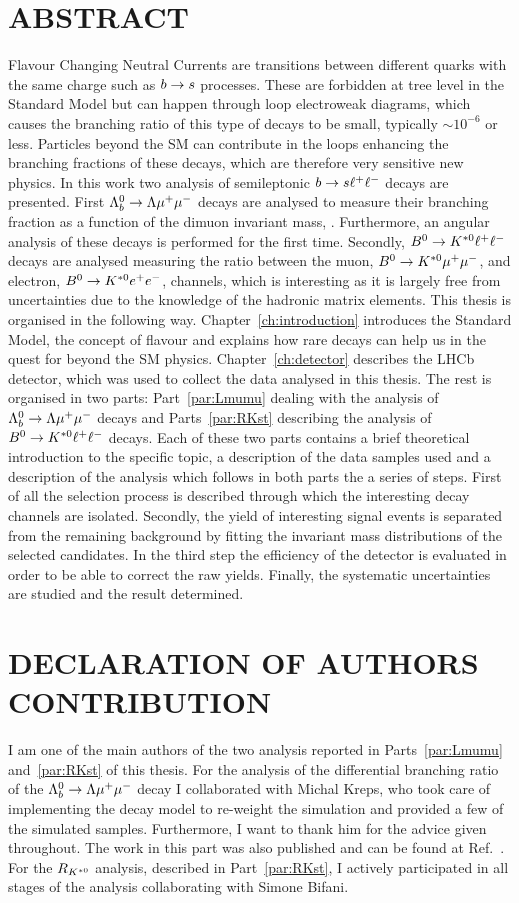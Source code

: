 \chapter*{ABSTRACT}
%
Flavour Changing Neutral Currents are transitions between different quarks with the same charge such as $b\rightarrow s$ processes. These are forbidden at tree level in the Standard Model but
can happen through loop electroweak diagrams, which causes the branching ratio of this type of decays
to be small, typically $\sim 10^{-6}$ or less. Particles beyond the SM can contribute in the loops enhancing
the branching fractions of these decays, which are therefore very sensitive new physics.
In this work two analysis of semileptonic $b\rightarrow s\ell^+ \ell^-$ decays are presented.
First $\Lambda^0_b\rightarrow\Lambda\mu^+\mu^-$ decays are analysed to measure their branching fraction as a function
of the dimuon invariant mass, \qsq. Furthermore, an angular analysis of these decays is performed for the first time. Secondly, $B^0\rightarrow K^{*0}\ell^+ \ell^-$ decays are analysed measuring the ratio between the muon, $B^0\rightarrow K^{*0}\mu^+\mu^-$, and electron, $B^0\rightarrow K^{*0}e^+ e^-$, channels, which is interesting as it is largely free
from uncertainties due to the knowledge of the hadronic matrix elements.
This thesis is organised in the following way. Chapter~\ref{ch:introduction} introduces the Standard Model,
the concept of flavour and explains how rare decays can help us in the quest for beyond the SM physics.
Chapter~\ref{ch:detector} describes the LHCb detector, which was used to collect the data analysed in this thesis.
The rest is organised in two parts: Part~\ref{par:Lmumu} dealing with the analysis of $\Lambda^0_b\rightarrow\Lambda\mu^+\mu^-$ 
decays and Parts~\ref{par:RKst} describing the analysis of $B^0\rightarrow K^{*0}\ell^+ \ell^-$ decays.
Each of these two parts contains a brief theoretical introduction to the specific topic, a description of the
data samples used and a description of the analysis which follows in both parts the a series of steps.
First of all the selection process is described through which the interesting decay channels are isolated.
Secondly, the yield of interesting signal events is separated from the remaining background by
fitting the invariant mass distributions of the selected candidates. In the third step the efficiency of the detector
is evaluated in order to be able to correct the raw yields. Finally, the systematic uncertainties are studied and
the result determined.
%
\clearpage
\chapter*{DECLARATION OF AUTHORS CONTRIBUTION}
%
I am one of the main authors of the two analysis reported in Parts~\ref{par:Lmumu} and~\ref{par:RKst}
of this thesis. For the analysis of the differential branching ratio of the $\Lambda^0_b\rightarrow\Lambda\mu^+\mu^-$ decay
I collaborated with Michal Kreps, who took care of implementing the decay model to re-weight
the simulation and provided a few of the simulated samples. Furthermore, I want to thank him
for the advice given throughout. The work in this part was also published and can be found at Ref.~\cite{Aaij:2015xza}.
For the $R_{K^{*0}}$ analysis, described in Part~\ref{par:RKst}, I actively participated in all stages of the analysis collaborating with Simone Bifani. 

